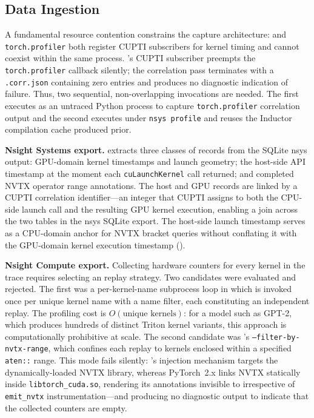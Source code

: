 \subsection{Data Ingestion}
\label{sec:ingestion}

A fundamental resource contention constrains the capture architecture: \nsys and
\texttt{torch.profiler} both register CUPTI subscribers for kernel timing and cannot coexist
within the same process. \nsys's CUPTI subscriber preempts the
\texttt{torch.profiler} callback silently; the correlation pass terminates with a
\texttt{.corr.json} containing zero entries and produces no diagnostic indication of failure.
Thus, two sequential, non-overlapping invocations are needed. The first executes as an untraced Python process to capture \texttt{torch.profiler} correlation output and the second executes under \texttt{nsys profile} and reuses the
Inductor compilation cache produced prior.

\textbf{Nsight Systems export.}
\sys extracts three classes of records from the SQLite nsys output:
GPU-domain kernel timestamps and launch geometry; the host-side API timestamp
at the moment each \texttt{cuLaunchKernel} call returned; and completed NVTX
operator range annotations.  The host and GPU records are linked by a CUPTI
correlation identifier---an integer that CUPTI assigns to both the CPU-side
launch call and the resulting GPU kernel execution, enabling a join across the
two tables in the nsys SQLite export.
The host-side launch timestamp serves as a CPU-domain anchor for NVTX bracket queries
without conflating it with the GPU-domain kernel execution timestamp ().

\textbf{Nsight Compute export.}  Collecting hardware counters for every kernel in the \nsys
trace requires selecting an \ncu replay strategy.  Two candidates were evaluated and rejected.
The first was a per-kernel-name subprocess loop in which \ncu is invoked once per unique
kernel name with a name filter, each constituting an independent replay.  The profiling cost
is $O(\text{unique kernels})$: for a model such as GPT-2, which produces hundreds of distinct
Triton kernel variants, this approach is computationally prohibitive at scale.  The second
candidate was \ncu's \texttt{--filter-by-nvtx-range}, which confines each replay to kernels
enclosed within a specified \texttt{aten::} range.  This mode fails silently: \ncu's injection
mechanism targets the dynamically-loaded NVTX library, whereas PyTorch~2.x links NVTX
statically inside \texttt{libtorch\_cuda.so}, rendering its annotations invisible to \ncu
irrespective of \texttt{emit\_nvtx} instrumentation---and producing no diagnostic output to
indicate that the collected counters are empty.

